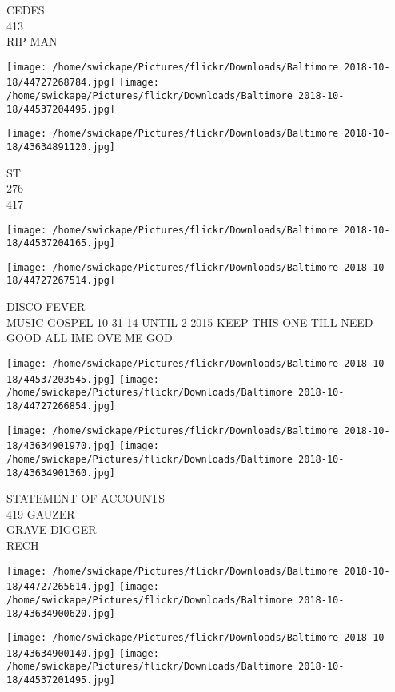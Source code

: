 \documentclass[10pt,letterpaper]{article}
\begin{document}
CEDES\\
413\\
RIP MAN\\
\pagebreak

\texttt{[image: /home/swickape/Pictures/flickr/Downloads/Baltimore 2018-10-18/44727268784.jpg]}
\texttt{[image: /home/swickape/Pictures/flickr/Downloads/Baltimore 2018-10-18/44537204495.jpg]}

\vspace{0.25in}
\texttt{[image: /home/swickape/Pictures/flickr/Downloads/Baltimore 2018-10-18/43634891120.jpg]}

ST\\
276\\
417\\
\pagebreak

\texttt{[image: /home/swickape/Pictures/flickr/Downloads/Baltimore 2018-10-18/44537204165.jpg]}

\vspace{0.25in}
\texttt{[image: /home/swickape/Pictures/flickr/Downloads/Baltimore 2018-10-18/44727267514.jpg]}

DISCO FEVER\\
MUSIC GOSPEL 10{-}31{-}14 UNTIL 2{-}2015 KEEP THIS ONE TILL NEED GOOD ALL IME OVE ME GOD\\
\pagebreak

\texttt{[image: /home/swickape/Pictures/flickr/Downloads/Baltimore 2018-10-18/44537203545.jpg]}
\texttt{[image: /home/swickape/Pictures/flickr/Downloads/Baltimore 2018-10-18/44727266854.jpg]}

\texttt{[image: /home/swickape/Pictures/flickr/Downloads/Baltimore 2018-10-18/43634901970.jpg]}
\texttt{[image: /home/swickape/Pictures/flickr/Downloads/Baltimore 2018-10-18/43634901360.jpg]}

STATEMENT OF ACCOUNTS\\
419 GAUZER\\
GRAVE DIGGER\\
RECH\\
\pagebreak

\texttt{[image: /home/swickape/Pictures/flickr/Downloads/Baltimore 2018-10-18/44727265614.jpg]}
\texttt{[image: /home/swickape/Pictures/flickr/Downloads/Baltimore 2018-10-18/43634900620.jpg]}

\texttt{[image: /home/swickape/Pictures/flickr/Downloads/Baltimore 2018-10-18/43634900140.jpg]}
\texttt{[image: /home/swickape/Pictures/flickr/Downloads/Baltimore 2018-10-18/44537201495.jpg]}
\end{document}
